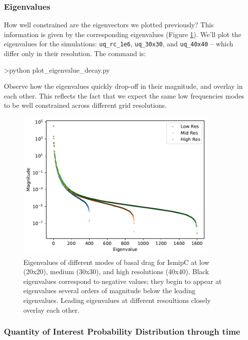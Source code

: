 \documentclass[11pt, reqno, nocenter]{article}
\begin{document}
\subsubsection{Eigenvalues}

How well constrained are the eigenvectors we plotted previously? This information is given by the corresponding eigenvalues (Figure \ref{fig:grid_convergence}). We'll plot the eigenvalues for the simulations: {\tt uq\_rc\_1e6}, {\tt uq\_30x30}, and {\tt uq\_40x40} -- which differ only in their resolution. The command is:

\begin{spverbatim}
>python plot_eigenvalue_decay.py
\end{spverbatim}

Observe how the eigenvalues quickly drop-off in their magnitude, and overlay in each other. This reflects the fact that we expect the same low frequencies modes to be well constrained across different grid resolutions.

\begin{figure}[!htbp]
  \centering
  \includegraphics[width=10cm]{./figures/grid_convergence.pdf}
  \caption[Grid Convergence of Eigenvalues]{Eigenvalues of different modes of basal drag for IsmipC at low (20x20), medium (30x30), and high resolutions (40x40). Black eigenvalues correspond to negative values; they begin to appear at eigenvalues several orders of magnitude below the leading eigenvalues.  Leading eigenvalues at different resoultions closely overlay each other. }
      \label{fig:grid_convergence}
\end{figure}

\subsubsection{Quantity of Interest Probability Distribution through time}
\end{document}
